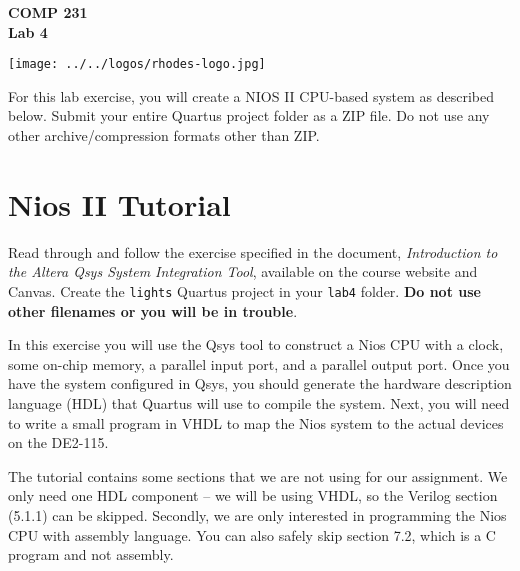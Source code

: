 \documentclass[10pt]{article}
\begin{document}
\hspace{-5mm}
\begin{minipage}{0.65\linewidth}
  \textbf{{\Large COMP 231\\Lab 4}}
\end{minipage}
\begin{minipage}{0.35\linewidth}
  \texttt{[image: ../../logos/rhodes-logo.jpg]}
\end{minipage}

\vspace{.5in}

\noindent For this lab exercise, you will create a NIOS II CPU-based
system as described below. Submit your entire Quartus project folder
as a ZIP file. Do not use any other archive/compression
formats other than ZIP. \\


\section{Nios II Tutorial}

Read through and follow the exercise specified in the document, {\em
  Introduction to the Altera Qsys System Integration Tool}, available on
the course website and Canvas. Create the {\tt lights} Quartus project in your {\tt lab4} folder. {\bf Do
not use other filenames or you will be in trouble}.

In this exercise you will use the Qsys tool to construct a Nios CPU with a
clock, some on-chip memory, a parallel input port, and a parallel output port.
Once you have the system configured in Qsys, you should generate the hardware
description language (HDL) that Quartus will use to compile the system.  Next,
you will need to write a small program in VHDL to map the Nios system to the
actual devices on the DE2-115.

The tutorial contains some sections that we are not using for our assignment.
We only need one HDL component -- we will be using VHDL, so the Verilog
section (5.1.1) can be skipped. Secondly, we are only interested in programming
the Nios CPU with assembly language. You can also safely skip section 7.2,
which is a C program and not assembly.
\end{document}
